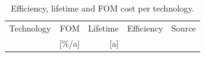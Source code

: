 \documentclass[3p]{elsarticle} %
\newcommand{\ra}[1]{\renewcommand{\arraystretch}{#1}}
\def\co{CO${}_2$}
\def\el{${}_{\textrm{el}}$}
\def\th{${}_{\textrm{th}}$}
\begin{document}
\begin{table}
\centering
\begin{threeparttable}
\caption{Efficiency, lifetime and FOM cost per technology.} \label{tab:inputs}
\centering
\begin{tabularx}{0.8\textwidth}{lrrrl}
\toprule
Technology & FOM\tnote{a} & Lifetime & Efficiency & Source\\
 & [\%/a] & [a] &  & \\
\midrule



\end{tabularx}
\end{threeparttable}
\end{table}
\end{document}
